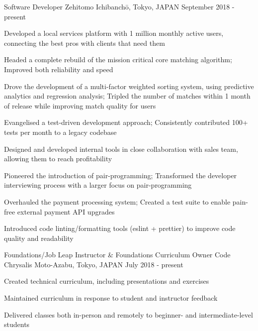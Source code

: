 
\begin{cventries}

  \cventry
  {Software Developer} %
  {Zehitomo} %
  {Ichibanchō, Tokyo, JAPAN} %
  {September 2018 - present} %
  {
    \begin{cvitems} %
      \item {Developed a local services platform with 1 million monthly active users, connecting the best pros with clients that need them}
      \item {Headed a complete rebuild of the mission critical core matching algorithm; Improved both reliability and speed}
      \item {Drove the development of a multi-factor weighted sorting system, using predictive analytics and regression analysis; Tripled the number of matches within 1 month of release while improving match quality for users}
      \item {Evangelised a test-driven development approach; Consistently contributed 100+ tests per month to a legacy codebase}
      \item {Designed and developed internal tools in close collaboration with sales team, allowing them to reach profitability}
      \item {Pioneered the introduction of pair-programming; Transformed the developer interviewing process with a larger focus on pair-programming}
      \item {Overhauled the payment processing system; Created a test suite to enable pain-free external payment API upgrades}
      \item {Introduced code linting/formatting tools (eslint + prettier) to improve code quality and readability}
    \end{cvitems}
  }

  \cventry
  {Foundations/Job Leap Instructor \& Foundations Curriculum Owner} %
  {Code Chrysalis} %
  {Moto-Azabu, Tokyo, JAPAN} %
  {July 2018 - present} %
  {
    \begin{cvitems} %
      \item {Created technical curriculum, including presentations and exercises}
      \item {Maintained curriculum in response to student and instructor feedback}
      \item {Delivered classes both in-person and remotely to beginner- and intermediate-level students}
    \end{cvitems}
  }


\end{cventries}

